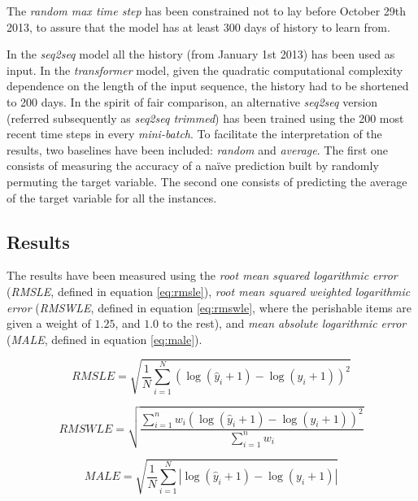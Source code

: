 The \textit{random max time step} has been constrained not to lay before October 29th 2013, to assure that the model has at least 300 days of history to learn from.

In the \textit{seq2seq} model all the history (from January 1st 2013) has been used as input.  In the \textit{transformer} model, given the quadratic computational complexity dependence on the length of the input sequence, the history had to be shortened to 200 days. In the spirit of fair comparison, an alternative \textit{seq2seq} version (referred subsequently as \textit{seq2seq trimmed}) has been trained using the 200 most recent time steps in every \textit{mini-batch}. To facilitate the interpretation of the results, two baselines have been included: \textit{random} and \textit{average}. The first one consists of measuring the accuracy of a naïve prediction built by randomly permuting the target variable. The second one consists of predicting the average of the target variable for all the instances.

\subsection{Results} \label{sec:salesforecast-results}

The results have been measured using the \textit{root mean squared logarithmic error} (\textit{RMSLE}, defined in equation \ref{eq:rmsle}), \textit{root mean squared weighted logarithmic error} (\textit{RMSWLE}, defined in equation \ref{eq:rmswle}, where the perishable items are given a weight of $1.25$, and $1.0$ to the rest),  and \textit{mean absolute logarithmic error} (\textit{MALE}, defined in equation \ref{eq:male}).

\begin{equation} \label{eq:rmsle}
RMSLE = \sqrt{ \frac{1}{N} \displaystyle\sum_{i=1}^N  \left(\log(\hat{y}_i + 1) - \log(y_i +1)  \right)^2  }
\end{equation}

\begin{equation} \label{eq:rmswle}
RMSWLE = \sqrt{ \frac{\displaystyle\sum_{i=1}^n w_i \left( \log(\hat{y}_i + 1) - \log(y_i +1)  \right)^2  }{\displaystyle\sum_{i=1}^n w_i}}
\end{equation}

\begin{equation} \label{eq:male}
MALE = \sqrt{ \frac{1}{N} \displaystyle\sum_{i=1}^N  \left|\log(\hat{y}_i + 1) - \log(y_i +1)  \right|  }
\end{equation}


